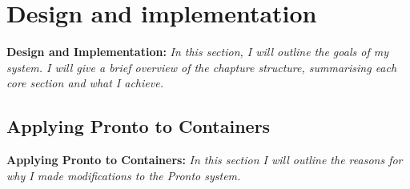 \chapter{Design and implementation}
\begin{tcolorbox}[boxsep=0mm,left=2.5mm,right=2.5mm]
    \textbf{Design and Implementation:} {\em In this section, I will outline the
    goals of my system. I will give a brief overview of the chapture structure,
    summarising each core section and what I achieve.}
\end{tcolorbox}

\section{Applying Pronto to Containers}
\begin{tcolorbox}[boxsep=0mm,left=2.5mm,right=2.5mm]
    \textbf{Applying Pronto to Containers:} {\em In this section I will outline
    the reasons for why I made modifications to the Pronto system.}
\end{tcolorbox}

